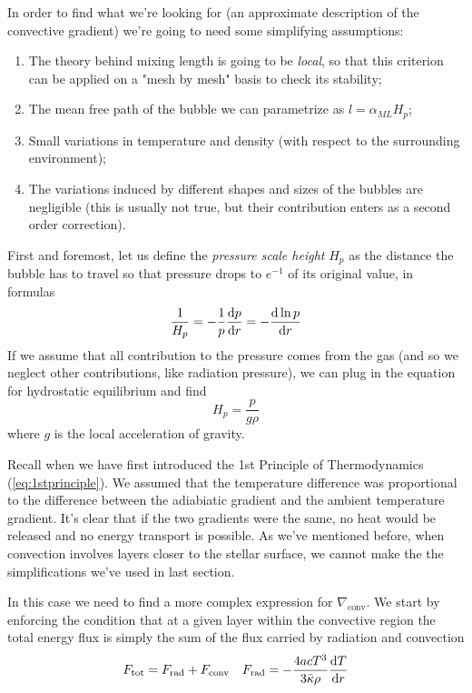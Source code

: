 In order to find what we're looking for (an approximate description of the convective gradient) we're going to need some simplifying assumptions:
\begin{enumerate}
	\item The theory behind mixing length is going to be \emph{local}, so that this criterion can be applied on a "mesh by mesh" basis to check its stability;
	\item The mean free path of the bubble we can parametrize as $l = \alpha_{ML}H_{p}$;
	\item Small variations in temperature and density (with respect to the surrounding environment);
	\item The variations induced by different shapes and sizes of the bubbles are negligible (this is usually not true, but their contribution enters as a second order correction).
\end{enumerate}
First and foremost, let us define the \emph{pressure scale height} $H_{p}$ as the distance the bubble has to travel so that pressure drops to $e^{-1}$ of its original value, in formulas
\begin{equation*}
	\frac{1}{H_{p}} = -\frac{1}{p}\frac{\text{d}p}{\text{d}r} = -\frac{\text{d}\ln p}{\text{d}r}
\end{equation*}
If we assume that all contribution to the pressure comes from the gas (and so we neglect other contributions, like radiation pressure), we can plug in the equation for hydrostatic equilibrium and find 
\begin{equation*}
	H_{p} = \frac{p}{g\rho}
\end{equation*}
where $g$ is the local acceleration of gravity.
\par Recall when we have first introduced the 1st Principle of Thermodynamics (\ref{eq:1stprinciple}). We assumed that the temperature difference was proportional to the difference between the adiabiatic gradient and the ambient temperature gradient. It's clear that if the two gradients were the same, no heat would be released and no energy transport is possible. As we've mentioned before, when convection involves layers closer to the stellar surface, we cannot make the the simplifications we've used in last section.
\par In this case we need to find a more complex expression for $\nabla_{\text{conv}}$. We start by enforcing the condition that at a given layer within the convective region the total energy flux is simply the sum of the flux carried by radiation and convection
\begin{equation}
	F_{\text{tot}} = F_{\text{rad}}+F_{\text{conv}} \quad F_{\text{rad}} = -\frac{4acT^{3}}{3\bar{\kappa}\rho}\frac{\text{d}T}{\text{d}r}
	\label{eq:fluxesrecap}
\end{equation}
